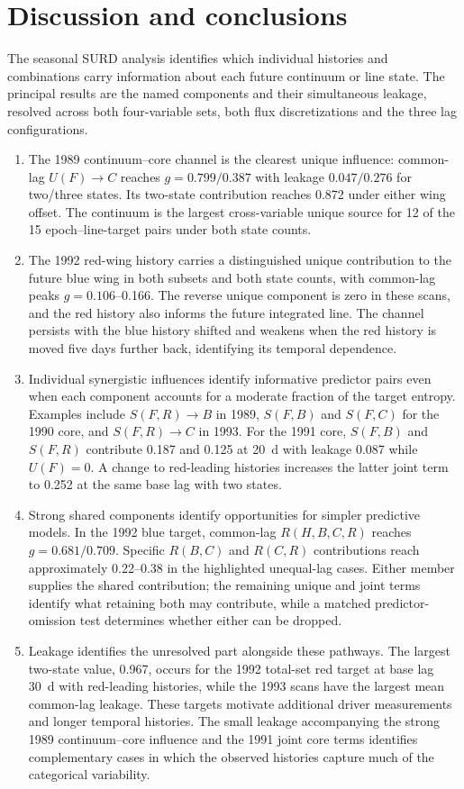 \documentclass[fleqn,usenatbib]{mnras}
\begin{document}
\section{Discussion and conclusions}
\label{sec:epoch_conclusions}
The seasonal SURD analysis identifies which individual histories and combinations carry information about each future continuum or line state. The principal results are the named components and their simultaneous leakage, resolved across both four-variable sets, both flux discretizations and the three lag configurations.
\begin{enumerate}
\item The 1989 continuum--core channel is the clearest unique influence: common-lag $U(F)\to C$ reaches $g=0.799/0.387$ with leakage $0.047/0.276$ for two/three states. Its two-state contribution reaches 0.872 under either wing offset. The continuum is the largest cross-variable unique source for 12 of the 15 epoch--line-target pairs under both state counts.
\item The 1992 red-wing history carries a distinguished unique contribution to the future blue wing in both subsets and both state counts, with common-lag peaks $g=0.106$--0.166. The reverse unique component is zero in these scans, and the red history also informs the future integrated line. The channel persists with the blue history shifted and weakens when the red history is moved five days further back, identifying its temporal dependence.
\item Individual synergistic influences identify informative predictor pairs even when each component accounts for a moderate fraction of the target entropy. Examples include $S(F,R)\to B$ in 1989, $S(F,B)$ and $S(F,C)$ for the 1990 core, and $S(F,R)\to C$ in 1993. For the 1991 core, $S(F,B)$ and $S(F,R)$ contribute 0.187 and 0.125 at 20~d with leakage 0.087 while $U(F)=0$. A change to red-leading histories increases the latter joint term to 0.252 at the same base lag with two states.
\item Strong shared components identify opportunities for simpler predictive models. In the 1992 blue target, common-lag $R(H,B,C,R)$ reaches $g=0.681/0.709$. Specific $R(B,C)$ and $R(C,R)$ contributions reach approximately 0.22--0.38 in the highlighted unequal-lag cases. Either member supplies the shared contribution; the remaining unique and joint terms identify what retaining both may contribute, while a matched predictor-omission test determines whether either can be dropped.
\item Leakage identifies the unresolved part alongside these pathways. The largest two-state value, 0.967, occurs for the 1992 total-set red target at base lag 30~d with red-leading histories, while the 1993 scans have the largest mean common-lag leakage. These targets motivate additional driver measurements and longer temporal histories. The small leakage accompanying the strong 1989 continuum--core influence and the 1991 joint core terms identifies complementary cases in which the observed histories capture much of the categorical variability.
\end{enumerate}
\end{document}
